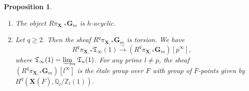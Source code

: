 \documentclass{amsart}
\newtheorem{Prop}[Thm]{Proposition}
\theoremstyle{remark}
\numberwithin{equation}{section}
\newcommand{\isomto}{\overset{\sim}{\to}}
\newcommand{\closure}[1]{\overline{#1}}
\newcommand{\Z}{\mathbb{Z}}
\newcommand{\Q}{\mathbb{Q}}
\newcommand{\Gm}{\mathbf{G}_{m}}
\newcommand{\dirlim}{\varinjlim}
\newcommand{\alg}[1]{\mathbf{#1}}
\begin{document}
\begin{Prop} \label{0073} \mbox{}
	\begin{enumerate}
		\item \label{0100}
			The object $R \pi_{\alg{X}, \ast} \Gm$ is $h$-acyclic.
		\item \label{0101}
			Let $q \ge 2$.
			Then the sheaf $R^{q} \pi_{\alg{X}, \ast} \Gm$ is torsion.
			We have
				\[
						R^{q} \pi_{\alg{X}, \ast} \mathfrak{T}_{\infty}(1)
					\isomto
						(R^{q} \pi_{\alg{X}, \ast} \Gm)[p^{\infty}],
				\]
			where $\mathfrak{T}_{\infty}(1) = \dirlim_{n} \mathfrak{T}_{n}(1)$.
			For any prime $l \ne p$, the sheaf
			$(R^{q} \pi_{\alg{X}, \ast} \Gm)[l^{\infty}]$ is the \'etale group over $F$
			with group of $\closure{F}$-points given by
			$H^{q}(\alg{X}(\closure{F}), \Q_{l} / \Z_{l}(1))$.
	\end{enumerate}
\end{Prop}
\end{document}
